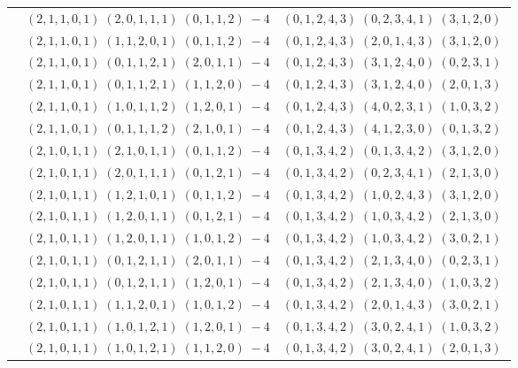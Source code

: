 \documentclass[11pt]{article}
\begin{document}
\begin{longtable}[l]{|c|c|c|}
 \cline{2-3} 
 & $(2 ,1 ,1 ,0 ,1) \;(2 ,0 ,1 ,1 ,1) \;(0 ,1 ,1 ,2) \;-4$ & $(0 ,1 ,2 ,4 ,3) \;(0 ,2 ,3 ,4 ,1) \;(3 ,1 ,2 ,0) \;$\\ 
 \cline{2-3} 
 & $(2 ,1 ,1 ,0 ,1) \;(1 ,1 ,2 ,0 ,1) \;(0 ,1 ,1 ,2) \;-4$ & $(0 ,1 ,2 ,4 ,3) \;(2 ,0 ,1 ,4 ,3) \;(3 ,1 ,2 ,0) \;$\\ 
 \cline{2-3} 
 & $(2 ,1 ,1 ,0 ,1) \;(0 ,1 ,1 ,2 ,1) \;(2 ,0 ,1 ,1) \;-4$ & $(0 ,1 ,2 ,4 ,3) \;(3 ,1 ,2 ,4 ,0) \;(0 ,2 ,3 ,1) \;$\\ 
 \cline{2-3} 
 & $(2 ,1 ,1 ,0 ,1) \;(0 ,1 ,1 ,2 ,1) \;(1 ,1 ,2 ,0) \;-4$ & $(0 ,1 ,2 ,4 ,3) \;(3 ,1 ,2 ,4 ,0) \;(2 ,0 ,1 ,3) \;$\\ 
 \cline{2-3} 
 & $(2 ,1 ,1 ,0 ,1) \;(1 ,0 ,1 ,1 ,2) \;(1 ,2 ,0 ,1) \;-4$ & $(0 ,1 ,2 ,4 ,3) \;(4 ,0 ,2 ,3 ,1) \;(1 ,0 ,3 ,2) \;$\\ 
 \cline{2-3} 
 & $(2 ,1 ,1 ,0 ,1) \;(0 ,1 ,1 ,1 ,2) \;(2 ,1 ,0 ,1) \;-4$ & $(0 ,1 ,2 ,4 ,3) \;(4 ,1 ,2 ,3 ,0) \;(0 ,1 ,3 ,2) \;$\\ 
 \cline{2-3} 
 & $(2 ,1 ,0 ,1 ,1) \;(2 ,1 ,0 ,1 ,1) \;(0 ,1 ,1 ,2) \;-4$ & $(0 ,1 ,3 ,4 ,2) \;(0 ,1 ,3 ,4 ,2) \;(3 ,1 ,2 ,0) \;$\\ 
 \cline{2-3} 
 & $(2 ,1 ,0 ,1 ,1) \;(2 ,0 ,1 ,1 ,1) \;(0 ,1 ,2 ,1) \;-4$ & $(0 ,1 ,3 ,4 ,2) \;(0 ,2 ,3 ,4 ,1) \;(2 ,1 ,3 ,0) \;$\\ 
 \cline{2-3} 
 & $(2 ,1 ,0 ,1 ,1) \;(1 ,2 ,1 ,0 ,1) \;(0 ,1 ,1 ,2) \;-4$ & $(0 ,1 ,3 ,4 ,2) \;(1 ,0 ,2 ,4 ,3) \;(3 ,1 ,2 ,0) \;$\\ 
 \cline{2-3} 
 & $(2 ,1 ,0 ,1 ,1) \;(1 ,2 ,0 ,1 ,1) \;(0 ,1 ,2 ,1) \;-4$ & $(0 ,1 ,3 ,4 ,2) \;(1 ,0 ,3 ,4 ,2) \;(2 ,1 ,3 ,0) \;$\\ 
 \cline{2-3} 
 & $(2 ,1 ,0 ,1 ,1) \;(1 ,2 ,0 ,1 ,1) \;(1 ,0 ,1 ,2) \;-4$ & $(0 ,1 ,3 ,4 ,2) \;(1 ,0 ,3 ,4 ,2) \;(3 ,0 ,2 ,1) \;$\\ 
 \cline{2-3} 
 & $(2 ,1 ,0 ,1 ,1) \;(0 ,1 ,2 ,1 ,1) \;(2 ,0 ,1 ,1) \;-4$ & $(0 ,1 ,3 ,4 ,2) \;(2 ,1 ,3 ,4 ,0) \;(0 ,2 ,3 ,1) \;$\\ 
 \cline{2-3} 
 & $(2 ,1 ,0 ,1 ,1) \;(0 ,1 ,2 ,1 ,1) \;(1 ,2 ,0 ,1) \;-4$ & $(0 ,1 ,3 ,4 ,2) \;(2 ,1 ,3 ,4 ,0) \;(1 ,0 ,3 ,2) \;$\\ 
 \cline{2-3} 
 & $(2 ,1 ,0 ,1 ,1) \;(1 ,1 ,2 ,0 ,1) \;(1 ,0 ,1 ,2) \;-4$ & $(0 ,1 ,3 ,4 ,2) \;(2 ,0 ,1 ,4 ,3) \;(3 ,0 ,2 ,1) \;$\\ 
 \cline{2-3} 
 & $(2 ,1 ,0 ,1 ,1) \;(1 ,0 ,1 ,2 ,1) \;(1 ,2 ,0 ,1) \;-4$ & $(0 ,1 ,3 ,4 ,2) \;(3 ,0 ,2 ,4 ,1) \;(1 ,0 ,3 ,2) \;$\\ 
 \cline{2-3} 
 & $(2 ,1 ,0 ,1 ,1) \;(1 ,0 ,1 ,2 ,1) \;(1 ,1 ,2 ,0) \;-4$ & $(0 ,1 ,3 ,4 ,2) \;(3 ,0 ,2 ,4 ,1) \;(2 ,0 ,1 ,3) \;$\\ 

\end{longtable}
\end{document}
